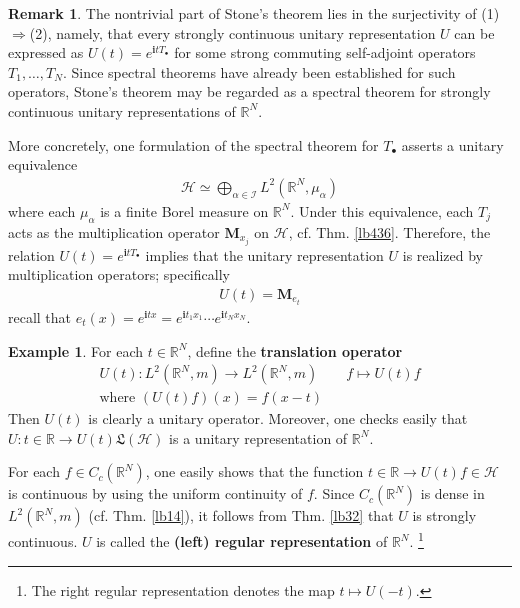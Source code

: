 \documentclass[12pt,b5paper,notitlepage]{article}
\theoremstyle{definition}
\newtheorem{eg}[df]{Example}
\newtheorem{rem}[df]{Remark}
\theoremstyle{plain}
\newcommand{\fk}{\mathfrak}
\newcommand{\im}{\mathbf{i}}
\newcommand{\blt}{\bullet}
\newcommand{\Rbb}{\mathbb R}
\newcommand{\MH}{\mathcal H}
\newcommand{\SI}{\mathscr I}
\newcommand{\Mbf}{\mathbf M}
\newcommand{\hqed}{\hfill\qedsymbol}
\numberwithin{equation}{section}
\begin{document}
\begin{rem}\label{lb526}
The nontrivial part of Stone's theorem lies in the surjectivity of (1)$\Rightarrow$(2), namely, that every strongly continuous unitary representation $U$ can be expressed as $U(t)=e^{\im tT_\blt}$ for some strong commuting self-adjoint operators $T_1,\dots,T_N$. Since spectral theorems have already been established for such operators, Stone’s theorem may be regarded as a spectral theorem for strongly continuous unitary representations of $\Rbb^N$.

More concretely, one formulation of the spectral theorem for $T_\blt$ asserts a unitary equivalence
\begin{align*}
\MH\simeq \bigoplus_{\alpha\in\SI}L^2(\Rbb^N,\mu_\alpha)
\end{align*}
where each $\mu_\alpha$ is a finite Borel measure on $\Rbb^N$. Under this equivalence, each $T_j$ acts as the multiplication operator $\Mbf_{x_j}$ on $\MH$, cf. Thm. \ref{lb436}. Therefore, the relation $U(t)=e^{\im tT_\blt}$ implies that the unitary representation $U$ is realized by multiplication operators; specifically
\begin{align*}
U(t)=\Mbf_{e_t}
\end{align*}
recall that $e_t(x)=e^{\im tx}=e^{\im t_1x_1}\cdots e^{\im t_Nx_N}$. \hqed
\end{rem}



\begin{eg}\label{lb540}
For each $t\in\Rbb^N$, define the \textbf{translation operator} 
\begin{gather*}
U(t):L^2(\Rbb^N,m)\rightarrow L^2(\Rbb^N,m)\qquad f\mapsto U(t)f\\
\text{where }(U(t)f)(x)=f(x-t)
\end{gather*}
Then $U(t)$ is clearly a unitary operator. Moreover, one checks easily that $U:t\in\Rbb\rightarrow U(t)\fk L(\MH)$ is a unitary representation of $\Rbb^N$. 

For each $f\in C_c(\Rbb^N)$, one easily shows that the function $t\in\Rbb\rightarrow U(t)f\in\MH$ is continuous by using the uniform continuity of $f$. Since $C_c(\Rbb^N)$ is dense in $L^2(\Rbb^N,m)$ (cf. Thm. \ref{lb14}), it follows from Thm. \ref{lb32} that $U$ is strongly continuous. $U$ is called the \textbf{(left) regular representation} \index{00@Regular representation of $\Rbb^N$} of $\Rbb^N$. \footnote{The right regular representation denotes the map $t\mapsto U(-t)$.} \hqed
\end{eg}
\end{document}
